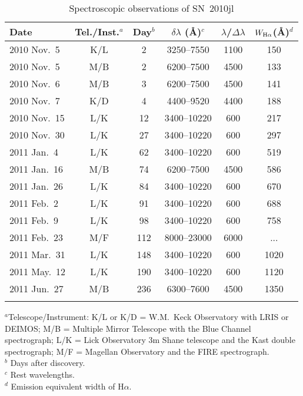 \documentclass{emulateapj}
\begin{document}
\begin{table}\begin{center}\begin{minipage}{3.25in}
      \caption{Spectroscopic observations of SN~2010\lowercase{jl}}
\scriptsize
\tighten
\begin{tabular}{@{}lccccc}\hline\hline
Date &Tel./Inst.$^a$ &Day$^b$ &$\delta\lambda$ (\AA)$^c$ 
   &$\lambda$/$\Delta\lambda$  &$W_{{\rm H}\alpha}$(\AA)$^d$  \\ 
\hline
%
2010 Nov.\ 5    &K/L &2   &3250--7550  &1100 &150 \\
2010 Nov.\ 5    &M/B &2   &6200--7500  &4500 &133 \\
2010 Nov.\ 6    &M/B &3   &6200--7500  &4500 &141 \\
2010 Nov.\ 7    &K/D &4   &4400--9520  &4400 &188 \\
2010 Nov.\ 15   &L/K &12  &3400--10220 &600  &217 \\
2010 Nov.\ 30   &L/K &27  &3400--10220 &600  &297 \\
2011 Jan.\ 4    &L/K &62  &3400--10220 &600  &519 \\
2011 Jan.\ 16   &M/B &74  &6200--7500  &4500 &586 \\
2011 Jan.\ 26   &L/K &84  &3400--10220 &600  &670 \\
2011 Feb.\ 2    &L/K &91  &3400--10220 &600  &688 \\
2011 Feb.\ 9    &L/K &98  &3400--10220 &600  &758 \\
2011 Feb.\ 23   &M/F &112 &8000--23000 &6000 &... \\
2011 Mar.\ 31   &L/K &148 &3400--10220 &600  &1020 \\
2011 May.\ 12   &L/K &190 &3400--10220 &600  &1120 \\
2011 Jun.\ 27   &M/B &236 &6300--7600  &4500 &1350 \\
%
\hline \\
\end{tabular}

$^a$Telescope/Instrument: K/L or K/D = W.M.\ Keck Observatory with
LRIS or DEIMOS; M/B = Multiple Mirror Telescope with the Blue Channel 
spectrograph; L/K = Lick Observatory 3m Shane telescope and the Kast 
double spectrograph; M/F =  Magellan Observatory and the FIRE 
spectrograph. \\
$^b$ Days after discovery. \\
$^c$ Rest wavelengths.  \\
$^d$ Emission equivalent width of H$\alpha$.
\label{tab:spectab}
\end{minipage}\end{center}
\end{table}%
\end{document}
